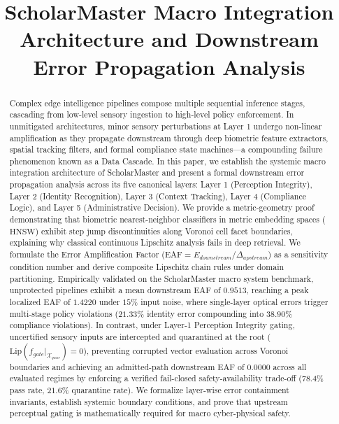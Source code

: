 \documentclass[conference]{IEEEtran}
\begin{document}
\title{ScholarMaster Macro Integration Architecture and Downstream Error Propagation Analysis}

\author{
}

\maketitle

\begin{abstract}
Complex edge intelligence pipelines compose multiple sequential inference stages, cascading from low-level sensory ingestion to high-level policy enforcement. In unmitigated architectures, minor sensory perturbations at Layer 1 undergo non-linear amplification as they propagate downstream through deep biometric feature extractors, spatial tracking filters, and formal compliance state machines---a compounding failure phenomenon known as a Data Cascade. In this paper, we establish the systemic macro integration architecture of ScholarMaster and present a formal downstream error propagation analysis across its five canonical layers: Layer 1 (Perception Integrity), Layer 2 (Identity Recognition), Layer 3 (Context Tracking), Layer 4 (Compliance Logic), and Layer 5 (Administrative Decision). We provide a metric-geometry proof demonstrating that biometric nearest-neighbor classifiers in metric embedding spaces ($\text{HNSW}$) exhibit step jump discontinuities along Voronoi cell facet boundaries, explaining why classical continuous Lipschitz analysis fails in deep retrieval. We formulate the Error Amplification Factor ($\text{EAF} = E_{downstream} / \Delta_{upstream}$) as a sensitivity condition number and derive composite Lipschitz chain rules under domain partitioning. Empirically validated on the ScholarMaster macro system benchmark, unprotected pipelines exhibit a mean downstream $\text{EAF}$ of $0.9513$, reaching a peak localized $\text{EAF}$ of $1.4220$ under $15\%$ input noise, where single-layer optical errors trigger multi-stage policy violations ($21.33\%$ identity error compounding into $38.90\%$ compliance violations). In contrast, under Layer-1 Perception Integrity gating, uncertified sensory inputs are intercepted and quarantined at the root ($\mathrm{Lip}(f_{gate}|_{\mathcal{X}_{quar}}) = 0$), preventing corrupted vector evaluation across Voronoi boundaries and achieving an admitted-path downstream $\text{EAF}$ of $0.0000$ across all evaluated regimes by enforcing a verified fail-closed safety-availability trade-off ($78.4\%$ pass rate, $21.6\%$ quarantine rate). We formalize layer-wise error containment invariants, establish systemic boundary conditions, and prove that upstream perceptual gating is mathematically required for macro cyber-physical safety.
\end{abstract}
\end{document}
